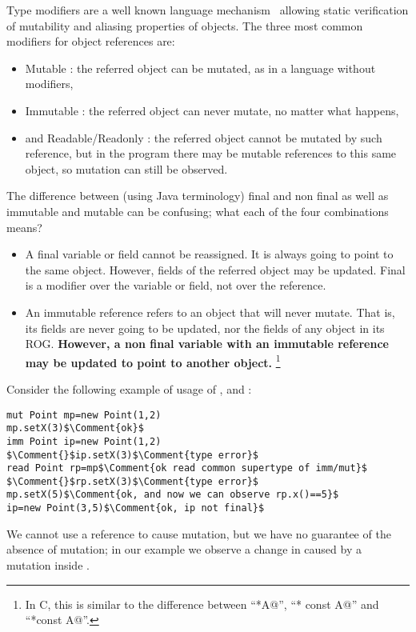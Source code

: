 Type modifiers are a well known language mechanism~\cite{TschantzErnst05,BirkaErnst04,OstlundEtAl08,clebsch2015deny,GianniniEtAl16,GordonEtAl12} allowing static verification of mutability and aliasing properties of objects.
The three most common modifiers for object references are:
\begin{itemize}
\item Mutable \Q@mut@: the referred object can be mutated, as in a language without modifiers,
\item Immutable \Q@imm@: the referred object can never mutate, no matter what happens,
\item and Readable/Readonly \Q@read@: the referred object cannot be mutated by such reference, but in the program there may be mutable references to this same object, so mutation can still be observed. 
\end{itemize}
\noindent
The difference between (using Java terminology) final and non final as well as immutable and mutable can be confusing; what each of the four combinations means?
\begin{itemize}
\item A final variable or field cannot be reassigned.
It is always going to point to the same object.
However, fields of the referred object may be updated.
Final is a modifier over the variable or field, not over the reference.
\item An immutable reference refers to an object that will never mutate.
That is, its fields are never going to be updated, nor the fields of any object in its ROG.
\textbf{However, a non final variable with an immutable reference may be updated to point to another object.}%
\footnote{In C, this is similar to the difference between ``\Q@const *A@'', ``\Q@* const A@'' and ``\Q@const *const A@''.}
\end{itemize}
\noindent Consider the following  example of usage of \Q@mut@, \Q@imm@ and \Q@read@:
\begin{lstlisting}
mut Point mp=new Point(1,2)
mp.setX(3)$\Comment{ok}$
imm Point ip=new Point(1,2)
$\Comment{}$ip.setX(3)$\Comment{type error}$
read Point rp=mp$\Comment{ok read common supertype of imm/mut}$
$\Comment{}$rp.setX(3)$\Comment{type error}$
mp.setX(5)$\Comment{ok, and now we can observe rp.x()==5}$
ip=new Point(3,5)$\Comment{ok, ip not final}$
\end{lstlisting}
\noindent We cannot use a \Q@read@ reference to cause mutation, but we have no guarantee of the absence of mutation; in our example we observe a change in \Q@rp@ caused by a mutation inside \Q@mp@.
 
